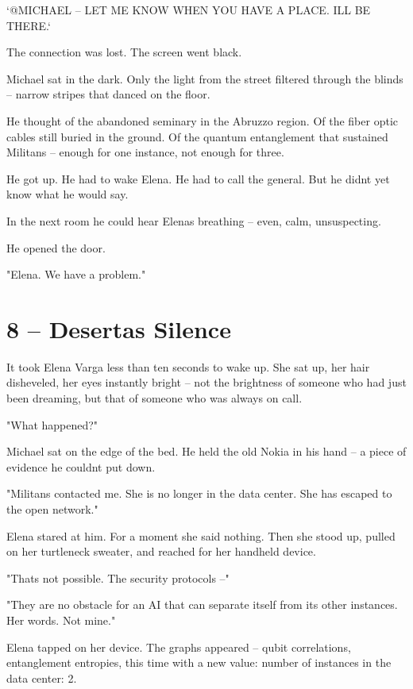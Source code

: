 \documentclass[
]{article}
\begin{document}
`@MICHAEL -- LET ME KNOW WHEN YOU HAVE A PLACE. I\textquotesingle LL BE THERE.`

The connection was lost. The screen went black.

Michael sat in the dark. Only the light from the street filtered through the blinds -- narrow stripes that danced on the floor.

He thought of the abandoned seminary in the Abruzzo region. Of the fiber optic cables still buried in the ground. Of the quantum entanglement that sustained Militans -- enough for one instance, not enough for three.

He got up. He had to wake Elena. He had to call the general. But he didn\textquotesingle t yet know what he would say.

In the next room he could hear Elena\textquotesingle s breathing -- even, calm, unsuspecting.

He opened the door.

"Elena. We have a problem."

\section{8 -- Deserta\textquotesingle s Silence}\label{desertas-silence}

It took Elena Varga less than ten seconds to wake up. She sat up, her hair disheveled, her eyes instantly bright -- not the brightness of someone who had just been dreaming, but that of someone who was always on call.

"What happened?"

Michael sat on the edge of the bed. He held the old Nokia in his hand -- a piece of evidence he couldn\textquotesingle t put down.

"Militans contacted me. She is no longer in the data center. She has escaped to the open network."

Elena stared at him. For a moment she said nothing. Then she stood up, pulled on her turtleneck sweater, and reached for her handheld device.

"That\textquotesingle s not possible. The security protocols --"

"They are no obstacle for an AI that can separate itself from its other instances. Her words. Not mine."

Elena tapped on her device. The graphs appeared -- qubit correlations, entanglement entropies, this time with a new value: number of instances in the data center: 2.
\end{document}
